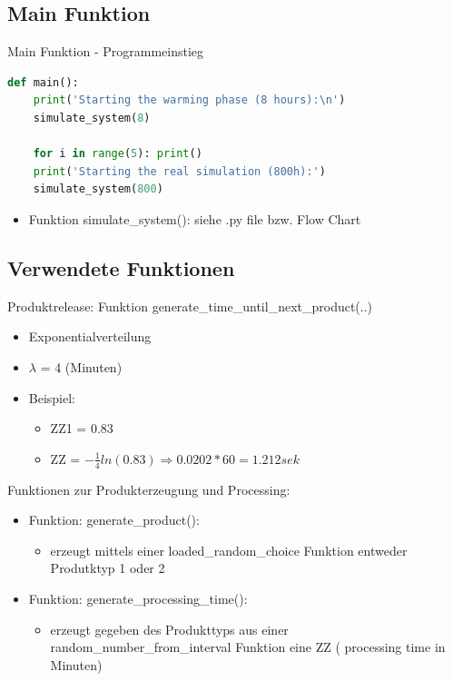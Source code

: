 \subsection{Main Funktion}
\begin{frame}[fragile]{Main Funktion - Programmeinstieg}
  \begin{lstlisting}[language=python]
def main():
    print('Starting the warming phase (8 hours):\n')
    simulate_system(8) 
    
    for i in range(5): print()
    print('Starting the real simulation (800h):')
    simulate_system(800)
\end{lstlisting}
\logopythonbottom

  \begin{itemize}
  	\item Funktion simulate\_system(): siehe .py file bzw. Flow Chart
  \end{itemize}
\end{frame}

\subsection{Verwendete Funktionen}
%
%




\begin{frame}[fragile]{Produktrelease: Funktion generate\_time\_until\_next\_product(..)}
  \begin{itemize}
  	\item Exponentialverteilung
  	\item $\lambda$ = 4 (Minuten)
  	\item Beispiel:
  	\begin{itemize}
  		\item ZZ1 = 0.83
  		\item ZZ = $- \frac{1}{4} ln(0.83) \Rightarrow 0.0202 * 60 = 1.212 sek$
  	\end{itemize}
  \end{itemize}
\end{frame}	

\begin{frame}[fragile]{Funktionen zur Produkterzeugung und Processing:}
  \begin{itemize}
  	\item Funktion: generate\_product():
  	  \begin{itemize}
  		\item erzeugt mittels einer loaded\_random\_choice Funktion entweder Produtktyp 1 oder 2
  	\end{itemize}
  	\vspace{1cm}
  	\item Funktion: generate\_processing\_time():
  	  \begin{itemize}
		\item erzeugt gegeben des Produkttyps aus einer random\_number\_from\_interval Funktion eine ZZ ( processing time in Minuten)
  	\end{itemize}
  \end{itemize}
\end{frame}	

